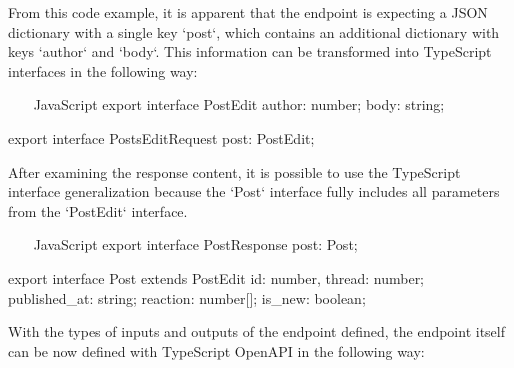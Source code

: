 \documentclass[
  digital, %
  oneside, %
  lof,     %
  nolot,     %
]{fithesis4}
\begin{document}
From this code example, it is apparent that the endpoint is expecting a JSON dictionary with a single key `post`, which contains an additional dictionary with keys `author` and `body`. This information can be transformed into TypeScript interfaces in the following way:


~~~ JavaScript
export interface PostEdit {
    author: number;
    body: string;
}

export interface PostsEditRequest {
    post: PostEdit;
}
~~~

After examining the response content, it is possible to use the TypeScript interface generalization because the `Post` interface fully includes all parameters from the `PostEdit` interface.

~~~ JavaScript
export interface PostResponse {
    post: Post;
}

export interface Post extends PostEdit {
    id: number,
    thread: number;
    published_at: string;
    reaction: number[];
    is_new: boolean;
}
~~~

With the types of inputs and outputs of the endpoint defined, the endpoint itself can be now defined with TypeScript OpenAPI in the following way:
\end{document}
